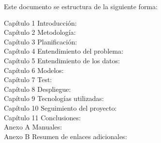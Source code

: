 Este documento se estructura de la siguiente forma:
\begin{description}
\item[Capítulo 1 Introducción:]
\item[Capítulo 2 Metodología:] 
\item[Capítulo 3 Planificación:]
\item[Capítulo 4 Entendimiento del problema:]
\item[Capítulo 5 Entendimiento de los datos:]
\item[Capítulo 6 Modelos:]
\item[Capítulo 7 Test:]
\item[Capítulo 8 Despliegue:]
\item[Capítulo 9 Tecnologías utilizadas:]
\item[Capítulo 10 Seguimiento del proyecto:]
\item[Capítulo 11 Conclusiones:]
\item[Anexo A Manuales:]
\item[Anexo B Resumen de enlaces adicionales:]
\end{description}
